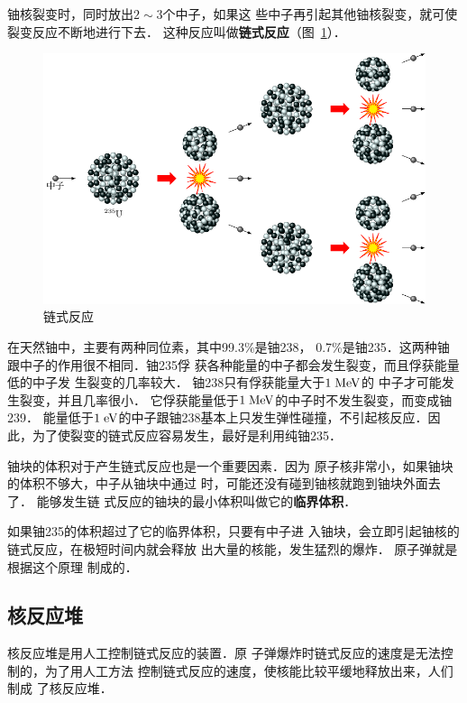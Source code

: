 铀核裂变时，同时放出$2 \sim 3$个中子，如果这
些中子再引起其他铀核裂变，就可使裂变反应不断地进行下去．
这种反应叫做\textbf{链式反应}（图~\ref{fig_C_9-13}）．

\begin{figure}[htbp]
    \centering
    \includegraphics{fig/C/9-13.pdf}
    \caption{链式反应}\label{fig_C_9-13}
\end{figure}


在天然铀中，主要有两种同位素，其中99.3\%是铀238，
0.7\%是铀235．这两种铀跟中子的作用很不相同．铀235俘
获各种能量的中子都会发生裂变，而且俘获能量低的中子发
生裂变的几率较大．
铀238只有俘获能量大于$1 \;\text{MeV}$的
中子才可能发生裂变，并且几率很小．
它俘获能量低于$1 \;\text{MeV}$的中子时不发生裂变，而变成铀239．
能量低于$1 \;\text{eV}$的中子跟铀238基本上只发生弹性碰撞，不引起核反应．因
此，为了使裂变的链式反应容易发生，最好是利用纯铀235．

铀块的体积对于产生链式反应也是一个重要因素．因为
原子核非常小，如果铀块的体积不够大，中子从铀块中通过
时，可能还没有碰到铀核就跑到铀块外面去了．
能够发生链
式反应的铀块的最小体积叫做它的\textbf{临界体积}．

如果铀235的体积超过了它的临界体积，只要有中子进
入铀块，会立即引起铀核的链式反应，在极短时间内就会释放
出大量的核能，发生猛烈的爆炸．
原子弹就是根据这个原理
制成的．

\subsection{核反应堆}

核反应堆是用人工控制链式反应的装置．原
子弹爆炸时链式反应的速度是无法控制的，为了用人工方法
控制链式反应的速度，使核能比较平缓地释放出来，人们制成
了核反应堆．


